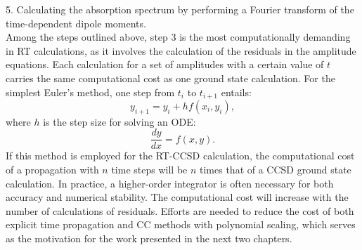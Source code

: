 5. Calculating the absorption spectrum by performing a Fourier transform of the time-dependent dipole moments. \\
Among the steps outlined above, step 3 is the most computationally demanding in RT calculations, as it involves the calculation of the residuals in the amplitude equations. Each calculation for a set of amplitudes with a certain value of $t$ carries the same computational cost as one ground state calculation. For the simplest Euler's method,\cite{Atkinson1991} one step from $t_{i}$ to $t_{i+1}$ entails:
\begin{equation}
y_{i+1} = y_{i} + hf(x_{i}, y_{i}),
\end{equation}
where $h$ is the step size for solving an ODE: 
\begin{equation}
\frac{dy}{dx}=f(x, y).
\end{equation}
If this method is employed for the RT-CCSD calculation, the computational cost of a propagation with $n$ time steps will be $n$ times that of a CCSD ground state calculation. In practice, a higher-order integrator is often necessary for both accuracy and numerical stability.\cite{Pedersen2019} The computational cost will increase with the number of calculations of residuals. Efforts are needed to reduce the cost of both explicit time propagation and CC methods with polynomial scaling, which serves as the motivation for the work presented in the next two chapters.


























